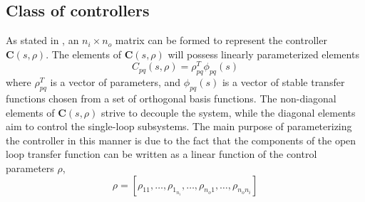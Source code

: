 \documentclass[A4, 10pt, conference]{ieeeconf}
\renewcommand{\vec}[1]{\mathbf{#1}}
\begin{document}
\subsection{Class of controllers}
As stated in \cite{GKL10b}, an $n_i \times n_o$ matrix can be formed to represent the controller $\vec{C}(s,\rho)$. The elements of $\vec{C}(s,\rho)$ will possess linearly parameterized elements
\begin{equation} \label{eq:mimo_con}
C_{pq}(s,\rho)=\rho^T_{pq}\phi_{pq}(s)
\end{equation}
where $\rho^T_{pq}$ is a vector of parameters, and $\phi_{pq}(s)$ is a vector of stable transfer functions chosen from a set of orthogonal basis functions. The non-diagonal elements of $\vec{C}(s,\rho)$ strive to decouple the system, while the diagonal elements aim to control the single-loop subsystems. The main purpose of parameterizing the controller in this manner is due to the fact that the components of the open loop transfer function can be written as a linear function of the control parameters $\rho$,
\begin{equation}
\rho=[\rho_{11},\ldots,\rho_{1_{n_{i}}},\ldots,\rho_{n_{o}1},\ldots,\rho_{n_{o}n_{i}}]
\end{equation}
\end{document}
